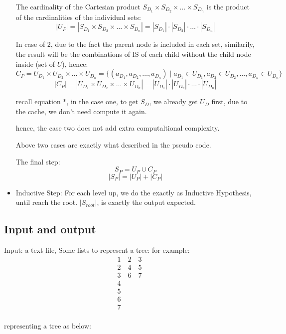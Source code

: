 \documentclass{article}
\begin{document}
\begin{itemize}
    The cardinality of the Cartesian product $S_{D_1} \times S_{D_2} \times \ldots \times S_{D_n}$ is the product of the cardinalities of the individual sets:
    \[|U_P| =|S_{D_1} \times S_{D_2} \times \ldots \times S_{D_n}| = |S_{D_1}| \cdot |S_{D_2}| \cdot \ldots \cdot |S_{D_n}| \]

    In case of 2, due to the fact the parent node is included in each set, similarily, 
    the result will be the combinations of IS of each child without the child node inside (set of $U$), hence:
    \[ C_P =  U_{D_1} \times U_{D_2} \times \ldots \times U_{D_n} = \{(a_{D_1}, a_{D_2}, \ldots, a_{D_n}) \mid a_{D_1} \in U_{D_1}, a_{D_2} \in U_{D_2}, \ldots, a_{D_n} \in U_{D_n}\} \]
    \[|C_P| =|U_{D_1} \times U_{D_2} \times \ldots \times U_{D_n}| = |U_{D_1}| \cdot |U_{D_2}| \cdot \ldots \cdot |U_{D_n}| \]

    recall equation $*$, in the case one, to get $S_{D}$, we already get $U_{D}$ first, due to the cache, we don't need compute it again. 

    hence, the case two does not add extra computaltional complexity.

    Above two cases are exactly what described in the pseudo code.
    
    The final step:
    \[ S_{P} =  U_{P} \cup C_{P} \] 
    \[ |S_{P}| =  |U_{P}| + |C_{P}| \] 



  \item Inductive Step: For each level up, we do the exactly as Inductive Hypothesis, until reach the root. $|S_{root}|$, is exactly the output expected.

  \end{itemize}


\subsection*{Input and output}
Input: a text file, 
Some lists to represent a tree:
for example:
\[
  \begin{array}{l}
1 \quad 2 \quad 3 \\
2 \quad 4 \quad 5 \\
3 \quad 6 \quad 7 \\
4 \\
5 \\
6 \\
7 \\
\end{array}
\]


representing a tree as below:
\end{document}
